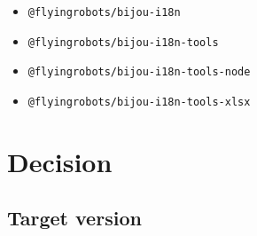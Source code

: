 \begin{itemize}
  \begin{itemize}
  \tightlist
  \item
    \texttt{@\allowbreak{}f\allowbreak{}l\allowbreak{}y\allowbreak{}i\allowbreak{}n\allowbreak{}g\allowbreak{}r\allowbreak{}o\allowbreak{}b\allowbreak{}o\allowbreak{}t\allowbreak{}s\allowbreak{}/\allowbreak{}b\allowbreak{}i\allowbreak{}j\allowbreak{}o\allowbreak{}u\allowbreak{}-\allowbreak{}i\allowbreak{}1\allowbreak{}8\allowbreak{}n}
  \item
    \texttt{@\allowbreak{}f\allowbreak{}l\allowbreak{}y\allowbreak{}i\allowbreak{}n\allowbreak{}g\allowbreak{}r\allowbreak{}o\allowbreak{}b\allowbreak{}o\allowbreak{}t\allowbreak{}s\allowbreak{}/\allowbreak{}b\allowbreak{}i\allowbreak{}j\allowbreak{}o\allowbreak{}u\allowbreak{}-\allowbreak{}i\allowbreak{}1\allowbreak{}8\allowbreak{}n\allowbreak{}-\allowbreak{}t\allowbreak{}o\allowbreak{}o\allowbreak{}l\allowbreak{}s}
  \item
    \texttt{@\allowbreak{}f\allowbreak{}l\allowbreak{}y\allowbreak{}i\allowbreak{}n\allowbreak{}g\allowbreak{}r\allowbreak{}o\allowbreak{}b\allowbreak{}o\allowbreak{}t\allowbreak{}s\allowbreak{}/\allowbreak{}b\allowbreak{}i\allowbreak{}j\allowbreak{}o\allowbreak{}u\allowbreak{}-\allowbreak{}i\allowbreak{}1\allowbreak{}8\allowbreak{}n\allowbreak{}-\allowbreak{}t\allowbreak{}o\allowbreak{}o\allowbreak{}l\allowbreak{}s\allowbreak{}-\allowbreak{}n\allowbreak{}o\allowbreak{}d\allowbreak{}e}
  \item
    \texttt{@\allowbreak{}f\allowbreak{}l\allowbreak{}y\allowbreak{}i\allowbreak{}n\allowbreak{}g\allowbreak{}r\allowbreak{}o\allowbreak{}b\allowbreak{}o\allowbreak{}t\allowbreak{}s\allowbreak{}/\allowbreak{}b\allowbreak{}i\allowbreak{}j\allowbreak{}o\allowbreak{}u\allowbreak{}-\allowbreak{}i\allowbreak{}1\allowbreak{}8\allowbreak{}n\allowbreak{}-\allowbreak{}t\allowbreak{}o\allowbreak{}o\allowbreak{}l\allowbreak{}s\allowbreak{}-\allowbreak{}x\allowbreak{}l\allowbreak{}s\allowbreak{}x}
  \end{itemize}
\end{itemize}

\section{Decision}\label{record-202-decision}

\subsection{Target version}\label{record-202-target-version}

